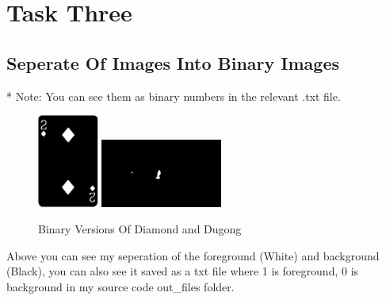 \documentclass[conference]{IEEEtran}
\begin{document}
\section{Task Three}
\subsection{Seperate Of Images Into Binary Images}
* Note: You can see them as binary numbers in the relevant .txt file.
\begin{figure}[htbp]
    \centerline{
        {\includegraphics[width=20mm, scale=0.5]{./figures/task 3/Diamond.png}}
        {\includegraphics[width=40mm, scale=0.5]{./figures/task 3/BinaryImage.png}}
    }
    \caption{Binary Versions Of Diamond and Dugong}
    \label{fig}
\end{figure}
Above you can see my seperation of the foreground (White) and background (Black), you can also see it saved as a txt file where 1 is foreground, 0 is background in my source code out\_files folder.
\end{document}
